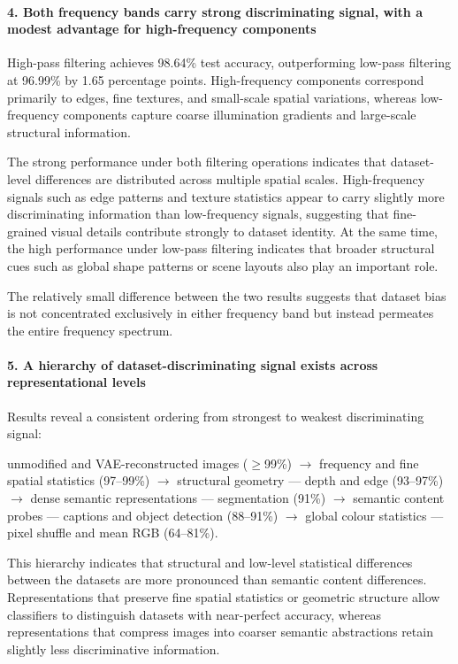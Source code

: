 \paragraph{4. Both frequency bands carry strong discriminating signal, with a modest advantage for high-frequency components}

High-pass filtering achieves 98.64\% test accuracy, outperforming low-pass filtering at 96.99\% by 1.65 percentage points. High-frequency components correspond primarily to edges, fine textures, and small-scale spatial variations, whereas low-frequency components capture coarse illumination gradients and large-scale structural information.

The strong performance under both filtering operations indicates that dataset-level differences are distributed across multiple spatial scales. High-frequency signals such as edge patterns and texture statistics appear to carry slightly more discriminating information than low-frequency signals, suggesting that fine-grained visual details contribute strongly to dataset identity. At the same time, the high performance under low-pass filtering indicates that broader structural cues such as global shape patterns or scene layouts also play an important role.

The relatively small difference between the two results suggests that dataset bias is not concentrated exclusively in either frequency band but instead permeates the entire frequency spectrum.

\paragraph{5. A hierarchy of dataset-discriminating signal exists across representational levels}

Results reveal a consistent ordering from strongest to weakest discriminating signal:

unmodified and VAE-reconstructed images ($\geq$99\%)  
$\rightarrow$ frequency and fine spatial statistics (97–99\%)  
$\rightarrow$ structural geometry — depth and edge (93–97\%)  
$\rightarrow$ dense semantic representations — segmentation (91\%)  
$\rightarrow$ semantic content probes — captions and object detection (88–91\%)  
$\rightarrow$ global colour statistics — pixel shuffle and mean RGB (64–81\%).

This hierarchy indicates that structural and low-level statistical differences between the datasets are more pronounced than semantic content differences. Representations that preserve fine spatial statistics or geometric structure allow classifiers to distinguish datasets with near-perfect accuracy, whereas representations that compress images into coarser semantic abstractions retain slightly less discriminative information.

